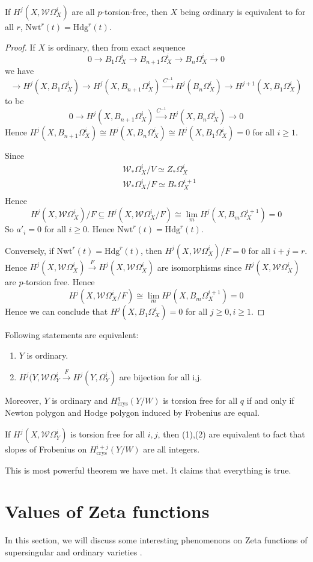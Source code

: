\begin{seccor}
	If $H^j(X, \mathcal{W}\Omega_X^i)$ are all $p$-torsion-free, then $X$ being ordinary is equivalent to  for all $r$, $\text{Nwt}^r(t) = \text{Hdg}^r(t)$.
\end{seccor}
\begin{proof}
	If $X$ is ordinary, then from exact sequence
	\[
	0 \to B_1 \Omega_X^i \to B_{n+1} \Omega_X^i \to B_n \Omega_X^i \to 0
	\]
	we have 
	\[
	 \to H^j(X, B_1 \Omega_X^i) \to H^j(X, B_{n+1} \Omega_X^i) \xrightarrow{C^{-1}} H^j(B_n \Omega_X^i) \to H^{j+1}(X, B_1 \Omega_X^i)
	\]
	to be 
	\[
	0 \to H^j(X, B_{n+1}\Omega_X^i) \xrightarrow{C^{-1}} H^j(X, B_n \Omega_X^i) \to 0
	\]
	Hence $H^{j}(X, B_{n+1} \Omega_X^i) \cong H^j(X, B_n \Omega_X^i) \cong H^j(X, B_1 \Omega_X^i) =0$ for all $i \geq 1$.
	
	Since 
	\[
	\begin{aligned}
	&\mathcal{W}_* \Omega_X^i /V \simeq Z_* \Omega_X^i\\
	&\mathcal{W}_* \Omega_X^i / F \simeq B_* \Omega_X^{i+1}\\
	\end{aligned}
	\]
	Hence
	\[
	H^j(X, \mathcal{W}\Omega_X^i)/F \subseteq H^j(X, \mathcal{W}\Omega_X^i /F) \cong \lim_m H^j(X, B_m \Omega_X^{i+1}) =0
	\]
	So $a'_i =0 $ for all $i \geq 0$. Hence $\text{Nwt}^r(t) = \text{Hdg}^r(t)$.
	
	Conversely, if $\text{Nwt}^r(t) = \text{Hdg}^r(t)$, then $H^j(X,\mathcal{W}\Omega_X^i)/F =0$ for all $i+j=r$. Hence 
	$H^j(X,\mathcal{W}\Omega_X^i) \xrightarrow{F} H^j(X,\mathcal{W}\Omega_X^i)$ are isomorphisms since $H^j(X,\mathcal{W}\Omega_X^i)$ are $p$-torsion free. Hence 
	\[
	H^j (X,\mathcal{W}\Omega_X^i /F) \cong \lim_m H^j(X, B_m \Omega_X^{i+1}) =0
	\] 
	Hence we can conclude that $H^j(X, B_1 \Omega_X^i)=0$ for all $j 
	\geq 0, i \geq 1$.
\end{proof}
\begin{secthm}
    Following statements are equivalent:
   	\begin{enumerate}
\item $Y$ is ordinary.
\item $H^j(Y,\mathcal{W}\Omega_Y^i \xrightarrow{F} H^j(Y,\Omega_Y^i)$ are bijection for all i,j.
   	\end{enumerate}
Moreover, $Y$ is ordinary and $H^q_{\text{crys}}(Y/W)$ is torsion free for all $q$ if and only if Newton polygon and Hodge polygon induced by Frobenius are equal.

If $H^j(X,\mathcal{W}\Omega_Y^i)$ is torsion free for all $i,j$, then (1),(2) are equivalent to fact that slopes of Frobenius on $H^{i+j}_{\text{crys}}(Y/W)$ are all integers.
\end{secthm}
\begin{secthm}
{\color{red} This is most powerful theorem we have met. It claims that everything is true.}
\end{secthm}
\section{Values of Zeta functions}
In this section, we will discuss some interesting phenomenons on Zeta functions of supersingular and ordinary varieties . 
